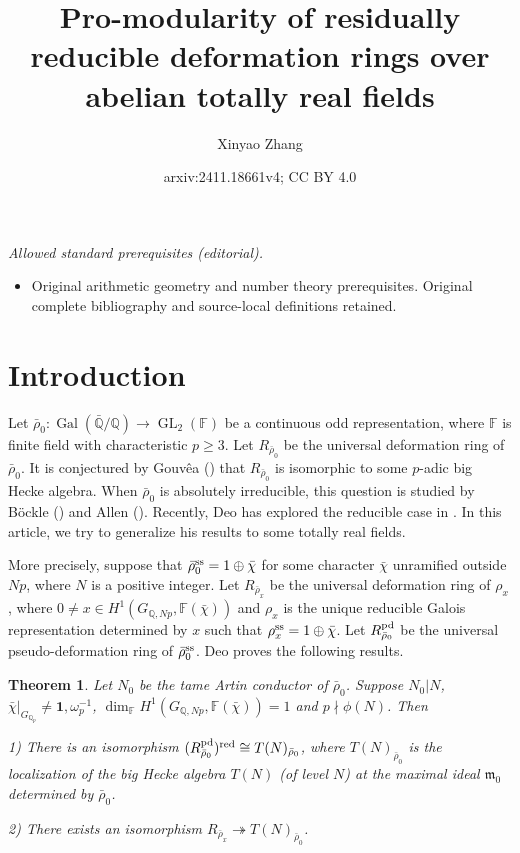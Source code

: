 \documentclass[12pt]{amsart}
\title{Pro-modularity of residually reducible deformation rings over abelian totally real fields}
\author{Xinyao Zhang}
\date{arxiv:2411.18661v4; CC BY 4.0}
\theoremstyle{plain}
\newtheorem{thm}{Theorem}[subsection]
\theoremstyle{definition}
\theoremstyle{remark}
\begin{document}
\maketitle
\noindent\textit{Allowed standard prerequisites (editorial).}\begin{itemize}
\item Original arithmetic geometry and number theory prerequisites. Original complete bibliography and source-local definitions retained.
\end{itemize}\medskip
\section{Introduction}

Let $\bar{\rho}_0: \operatorname{Gal}(\bar{\mathbb{Q}}/\mathbb{Q}) \to \operatorname{GL}_2(\mathbb{F})$ be a continuous odd representation, where $\mathbb{F}$ is finite field with characteristic $p \ge 3$. Let $R_{\bar{\rho}_0}$ be the universal deformation ring of $\bar{\rho}_0$. It is conjectured by Gouv\^ea (\cite{gouvea2006arithmetic}) that $R_{\bar{\rho}_0}$ is isomorphic to some $p$-adic big Hecke algebra. When $\bar{\rho}_0$ is absolutely irreducible, this question is studied by B\"ockle (\cite{bockle2001density}) and Allen (\cite{allen2019automorphic}). Recently, Deo has explored the reducible case in \cite{deo2023density}. In this article, we try to generalize his results to some totally real fields.

More precisely, suppose that $\bar{\rho}_0^{\textnormal{ss}} =1 \oplus \bar{\chi}$ for some character $\bar{\chi}$ unramified outside $Np$, where $N$ is a positive integer. Let $R_{\bar{\rho}_x}$ be the universal deformation ring of $\rho_x$, where $0 \ne x \in H^1(G_{\mathbb{Q}, Np}, \mathbb{F}(\bar{\chi}))$ and $\rho_x$ is the unique reducible Galois representation determined by $x$ such that $\rho_x^{\textnormal{ss}}=1 \oplus \bar{\chi}$. Let $R_{\bar{\rho}_0}^{\textnormal{pd}}$ be the universal pseudo-deformation ring of $\bar{\rho}_0^{\textnormal{ss}}$. Deo proves the following results.


\begin{thm}{\cite[Theorem A, Theorem 4.5]{deo2023density}}
	Let $N_0$ be the tame Artin conductor of $\bar{\rho}_0$. Suppose $N_0|N$, $\bar{\chi}|_{G_{\mathbb{Q}_p}} \ne \mathbf{1}, \omega_p^{-1}$, $\operatorname{dim}_{\mathbb{F}} H^1(G_{\mathbb{Q}, Np}, \mathbb{F}(\bar{\chi}))=1$ and $p \nmid \phi(N)$. Then
	
	1) There is an isomorphism $ (R_{\bar{\rho}_0}^{\textnormal{pd}})^{\operatorname{red}} \cong T(N)_{\bar{\rho}_0}$, where $T(N)_{\bar{\rho}_0}$ is the localization of the big Hecke algebra $T(N)$ (of level $N$) at the maximal ideal $\mathfrak{m}_0$ determined by $\bar{\rho}_0$.
	
	2) There exists an isomorphism $ R_{\bar{\rho}_x} \twoheadrightarrow T(N)_{\bar{\rho}_0}$.
\end{thm} 
 
\end{document}
